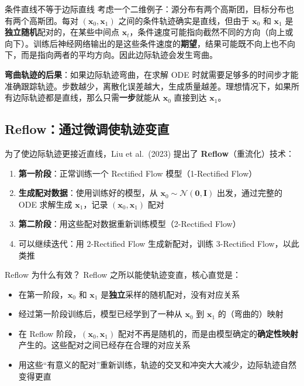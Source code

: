 \begin{warningbox}{条件直线不等于边际直线}
考虑一个二维例子：源分布有两个高斯团，目标分布也有两个高斯团。每对 $(\mathbf{x}_0, \mathbf{x}_1)$ 之间的条件轨迹确实是直线，但由于 $\mathbf{x}_0$ 和 $\mathbf{x}_1$ 是\textbf{独立随机}配对的，在某些中间点 $\mathbf{x}_t$，条件速度可能指向截然不同的方向（向上或向下）。训练后神经网络输出的是这些条件速度的\textbf{期望}，结果可能既不向上也不向下，而是指向两者的平均方向。因此边际轨迹会发生弯曲。
\end{warningbox}

\textbf{弯曲轨迹的后果}：如果边际轨迹弯曲，在求解 ODE 时就需要足够多的时间步才能准确跟踪轨迹。步数越少，离散化误差越大，生成质量越差。理想情况下，如果所有边际轨迹都是直线，那么只需\textbf{一步}就能从 $\mathbf{x}_0$ 直接到达 $\mathbf{x}_1$。

\subsection{Reflow：通过微调使轨迹变直}

为了使边际轨迹更接近直线，Liu et al.\ (2023) 提出了 \textbf{Reflow}（重流化）技术：

\begin{enumerate}
    \item \textbf{第一阶段}：正常训练一个 Rectified Flow 模型（1-Rectified Flow）
    \item \textbf{生成配对数据}：使用训练好的模型，从 $\mathbf{x}_0 \sim \mathcal{N}(\mathbf{0}, \mathbf{I})$ 出发，通过完整的 ODE 求解生成 $\mathbf{x}_1$，记录 $(\mathbf{x}_0, \mathbf{x}_1)$ 配对
    \item \textbf{第二阶段}：用这些配对数据重新训练模型（2-Rectified Flow）
    \item 可以继续迭代：用 2-Rectified Flow 生成新配对，训练 3-Rectified Flow，以此类推
\end{enumerate}

\begin{importantbox}{Reflow 为什么有效？}
Reflow 之所以能使轨迹变直，核心直觉是：
\begin{itemize}
    \item 在第一阶段，$\mathbf{x}_0$ 和 $\mathbf{x}_1$ 是\textbf{独立}采样的随机配对，没有对应关系
    \item 经过第一阶段训练后，模型已经学到了一种从 $\mathbf{x}_0$ 到 $\mathbf{x}_1$ 的（弯曲的）映射
    \item 在 Reflow 阶段，$(\mathbf{x}_0, \mathbf{x}_1)$ 配对不再是随机的，而是由模型确定的\textbf{确定性映射}产生的。这些配对之间已经存在合理的对应关系
    \item 用这些``有意义的配对''重新训练，轨迹的交叉和冲突大大减少，边际轨迹自然变得更直
\end{itemize}
\end{importantbox}

